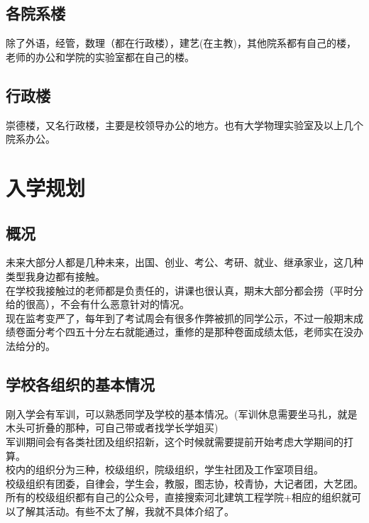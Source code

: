 \documentclass[12pt]{article} %
\begin{document}
	\subsection{各院系楼}
	除了外语，经管，数理（都在行政楼），建艺(在主教)，其他院系都有自己的楼，老师的办公和学院的实验室都在自己的楼。
	
		\subsection{行政楼}
	崇德楼，又名行政楼，主要是校领导办公的地方。也有大学物理实验室及以上几个院系办公。
	\newpage
	
	\section{入学规划} 
	\subsection{概况}
	未来大部分人都是几种未来，出国、创业、考公、考研、就业、继承家业，这几种类型我身边都有接触。\\
	
	在学校我接触过的老师都是负责任的，讲课也很认真，期末大部分都会捞（平时分给的很高），不会有什么恶意针对的情况。\\
	
	现在监考变严了，每年到了考试周会有很多作弊被抓的同学公示，不过一般期末成绩卷面分考个四五十分左右就能通过，重修的是那种卷面成绩太低，老师实在没办法给分的。
	
	\subsection{学校各组织的基本情况}
	刚入学会有军训，可以熟悉同学及学校的基本情况。(军训休息需要坐马扎，就是木头可折叠的那种，可自己带或者找学长学姐买)\\
	
	军训期间会有各类社团及组织招新，这个时候就需要提前开始考虑大学期间的打算。\\
	
	校内的组织分为三种，校级组织，院级组织，学生社团及工作室项目组。\\
	
	
	校级组织有团委，自律会，学生会，教服，图志协，校青协，大记者团，大艺团。\\
	
	所有的校级组织都有自己的公众号，直接搜索河北建筑工程学院+相应的组织就可以了解其活动。有些不太了解，我就不具体介绍了。\\
	
\end{document}
